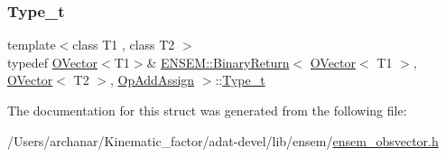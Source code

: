\subsubsection{\texorpdfstring{Type\_t}{Type\_t}\hspace{0.1cm}{\footnotesize\ttfamily [3/3]}}
{\footnotesize\ttfamily template$<$class T1 , class T2 $>$ \\
typedef \mbox{\hyperlink{classENSEM_1_1OVector}{O\+Vector}}$<$T1$>$\& \mbox{\hyperlink{structENSEM_1_1BinaryReturn}{E\+N\+S\+E\+M\+::\+Binary\+Return}}$<$ \mbox{\hyperlink{classENSEM_1_1OVector}{O\+Vector}}$<$ T1 $>$, \mbox{\hyperlink{classENSEM_1_1OVector}{O\+Vector}}$<$ T2 $>$, \mbox{\hyperlink{structENSEM_1_1OpAddAssign}{Op\+Add\+Assign}} $>$\+::\mbox{\hyperlink{structENSEM_1_1BinaryReturn_3_01OVector_3_01T1_01_4_00_01OVector_3_01T2_01_4_00_01OpAddAssign_01_4_a6a0e2c2cf466c9c8da44fef6943d3385}{Type\+\_\+t}}}



The documentation for this struct was generated from the following file\+:\begin{DoxyCompactItemize}
\item 
/\+Users/archanar/\+Kinematic\+\_\+factor/adat-\/devel/lib/ensem/\mbox{\hyperlink{adat-devel_2lib_2ensem_2ensem__obsvector_8h}{ensem\+\_\+obsvector.\+h}}\end{DoxyCompactItemize}
